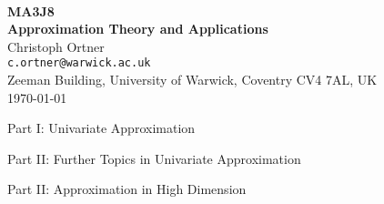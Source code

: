 \documentclass[a4paper, 11pt, reqno]{article}
\numberwithin{equation}{section}
\numberwithin{theorem}{section}
\begin{document}
\begin{center}
  \hfill \\[4cm]
  {\Large \bf MA3J8} \\[1mm]
  {\Large \bf Approximation Theory and Applications} \\[4mm]
  {\large Christoph Ortner} \\
  {\small \tt c.ortner@warwick.ac.uk} \\
  {\small Zeeman Building, University of Warwick, Coventry CV4 7AL, UK} \\[4mm]
  {\today}
\end{center}

\clearpage
\quad
\clearpage

\tableofcontents

\clearpage



\clearpage

\vspace{5cm}

{\huge Part I: Univariate Approximation}

\clearpage


\clearpage


\clearpage 

\vspace{5cm}

{\huge Part II: Further Topics in Univariate Approximation}


\clearpage


\clearpage


\clearpage


\clearpage 
\vspace{5cm} 

{\huge Part II: Approximation in High Dimension}

\clearpage 






\end{document}

